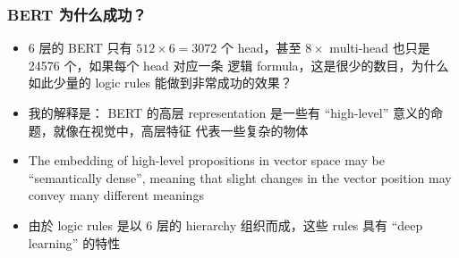 \documentclass[16pt]{beamer}
\newcommand{\cc}[2]{#1}
\newcommand{\cc}[2]{#2}
\newcommand{\emp}[1]{{\color{violet}#1}}
\begin{document}
\begin{frame}
\frametitle{\cc{BERT 为什么成功？}{Why is BERT so successful?}}
\begin{itemize}
	\item \cc{6 层的 BERT 只有 $512 \times 6 = 3072$ 个 head，甚至 $8\times$ multi-head 也只是 24576 个，如果每个 head 对应一条 逻辑 formula，这是很少的数目，为什么如此少量的 logic rules 能做到非常成功的效果？}
	{The 6-layer BERT has $512 \times 6 = 3072$ heads, or 24576 with $8\times$ multi-head attention.  If each head corresponds to 1 logic formula, this is a rather small number.  How could few logic rules perform so successfully? }

	\item \cc{
	我的解释是： BERT 的高层 representation 是一些有 ``high-level'' 意义的命题，就像在视觉中，高层特征 代表一些复杂的物体}{
	My explanation: The representation in BERT's higher layers are ``high-level'' propositions similar to the high-level features that represent complex objects in machine vision.
	}
	
	\item The embedding of high-level propositions in vector space may be ``semantically dense'', meaning that slight changes in the vector position may convey many different meanings
	
	\item \cc{
	由於 logic rules 是以 6 层的 hierarchy 组织而成，这些 rules 具有 ``\emp{deep learning}'' 的特性}{
	Because logic rules are organized in 6 layers of \emp{hierarchy}, they have the ``deep learning'' property
	}
\end{itemize}
\end{frame}
\end{document}
